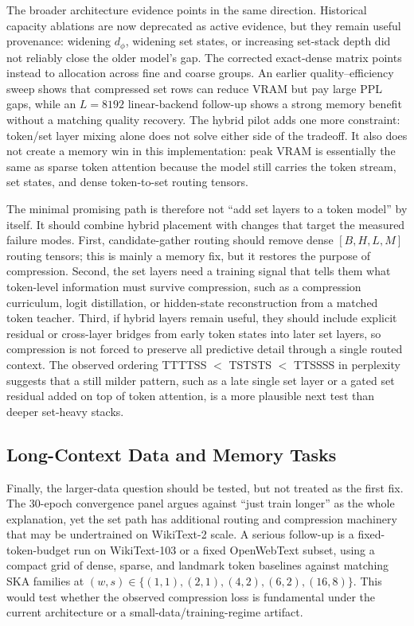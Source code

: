 \documentclass{article}
\theoremstyle{plain}
\theoremstyle{definition}
\theoremstyle{remark}
\begin{document}
	The broader architecture evidence points in the same direction.  Historical
	capacity ablations are now deprecated as active evidence, but they remain
	useful provenance: widening $d_\phi$, widening set states, or increasing
	set-stack depth did not reliably close the older model's gap.  The corrected
	exact-dense matrix points instead to allocation across fine and coarse groups.
	An earlier quality--efficiency sweep shows that compressed set rows can reduce
	VRAM but pay large PPL gaps, while an $L=8192$ linear-backend follow-up shows a strong memory
	benefit without a matching quality recovery.  The hybrid pilot adds one more
	constraint: token/set layer mixing alone does not solve either side of the
	tradeoff.  It also does not create a memory win in this implementation: peak
	VRAM is essentially the same as sparse token attention because the model still
	carries the token stream, set states, and dense token-to-set routing tensors.
	
	The minimal promising path is therefore not ``add set layers to a token model''
	by itself.  It should combine hybrid placement with changes that target the
	measured failure modes.  First, candidate-gather routing should remove dense
	$[B,H,L,M]$ routing tensors; this is mainly a memory fix, but it restores the
	purpose of compression.  Second, the set layers need a training signal that
	tells them what token-level information must survive compression, such as a
	compression curriculum, logit distillation, or hidden-state reconstruction from
	a matched token teacher.  Third, if hybrid layers remain useful, they should
	include explicit residual or cross-layer bridges from early token states into
	later set layers, so compression is not forced to preserve all predictive detail
	through a single routed context.  The observed ordering
	TTTTSS $<$ TSTSTS $<$ TTSSSS in perplexity suggests that a still milder
	pattern, such as a late single set layer or a gated set residual added on top of
	token attention, is a more plausible next test than deeper set-heavy stacks.
	
\FloatBarrier

\subsection{Long-Context Data and Memory Tasks}
\label{sec:future-long-context-memory-tasks}

Finally, the larger-data question should be tested, but not treated as the first
fix.  The 30-epoch convergence panel argues against ``just train longer'' as the
whole explanation, yet the set path has additional routing and compression
machinery that may be undertrained on WikiText-2 scale.  A serious follow-up is
a fixed-token-budget run on WikiText-103 or a fixed OpenWebText subset, using a
compact grid of dense, sparse, and landmark token baselines against matching SKA
families at $(w,s)\in\{(1,1),(2,1),(4,2),(6,2),(16,8)\}$.  This would test whether the
observed compression loss is fundamental under the current architecture or a
small-data/training-regime artifact.
\end{document}
